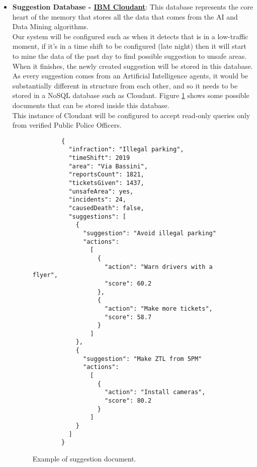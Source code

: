 \begin{itemize}
	\item \textbf{Suggestion Database - \href{https://cloud.ibm.com/catalog/services/cloudant}{IBM Cloudant}}: This database represents the core heart of the memory that stores all the data that comes from the AI and Data Mining algorithms.
	\\Our system will be configured such as when it detects that is in a low-traffic moment, if it's in a time shift to be configured (late night) then it will start to mine the data of the past day to find possible suggestion to unsafe areas. When it finishes, the newly created suggestion will be stored in this database.
	\\As every suggestion comes from an Artificial Intelligence agents, it would be substantially different in structure from each other, and so it needs to be stored in a NoSQL database such as Cloudant. Figure \ref{fig:jsondoc} shows some possible documents that can be stored inside this database.
	\\This instance of Cloudant will be configured to accept read-only queries only from verified Public Police Officers.
	\begin{figure}[h!]
		\begin{lstlisting}
		{
		  "infraction": "Illegal parking",
		  "timeShift": 2019
		  "area": "Via Bassini",
		  "reportsCount": 1821,
		  "ticketsGiven": 1437,
		  "unsafeArea": yes,
		  "incidents": 24,
		  "causedDeath": false,
		  "suggestions": [
			{
			  "suggestion": "Avoid illegal parking"
			  "actions":
			    [ 
				  {
				    "action": "Warn drivers with a flyer",
				    "score": 60.2
				  },
				  {
				    "action": "Make more tickets",
				    "score": 58.7
				  }
			    ]
			},
			{
			  "suggestion": "Make ZTL from 5PM"
			  "actions":
			    [ 
			      {
			        "action": "Install cameras",
			        "score": 80.2
			      }
			    ]
			}
		  ]
		}
		\end{lstlisting}
		\caption{Example of suggestion document.}
		\label{fig:jsondoc}
	\end{figure}
	\FloatBarrier
	

\end{itemize}
